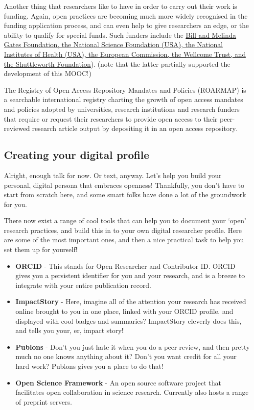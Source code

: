 \documentclass[]{book}
\begin{document}
Another thing that researchers like to have in order to carry out their work is funding. Again, open practices are becoming much more widely recognised in the funding application process, and can even help to give researchers an edge, or the ability to qualify for special funds. Such funders include the \href{http://whyopenresearch.org/funding}{Bill and Melinda Gates Foundation, the National Science Foundation (USA), the National Institutes of Health (USA), the European Commission, the Wellcome Trust, and the Shuttleworth Foundation}). (note that the latter partially supported the development of this MOOC!)

The Registry of Open Access Repository Mandates and Policies (ROARMAP) is a searchable international registry charting the growth of open access mandates and policies adopted by universities, research institutions and research funders that require or request their researchers to provide open access to their peer-reviewed research article output by depositing it in an open access repository.

\hypertarget{creating-your-digital-profile}{%
\subsection{Creating your digital profile }\label{creating-your-digital-profile}}

Alright, enough talk for now. Or text, anyway. Let's help you build your personal, digital persona that embraces openness! Thankfully, you don't have to start from scratch here, and some smart folks have done a lot of the groundwork for you.

There now exist a range of cool tools that can help you to document your `open' research practices, and build this in to your own digital researcher profile. Here are some of the most important ones, and then a nice practical task to help you set them up for yourself!

\begin{itemize}
\item
  \textbf{ORCID} - This stands for Open Researcher and Contributor ID. ORCID gives you a persistent identifier for you and your research, and is a breeze to integrate with your entire publication record.
\item
  \textbf{ImpactStory} - Here, imagine all of the attention your research has received online brought to you in one place, linked with your ORCID profile, and displayed with cool badges and summaries? ImpactStory cleverly does this, and tells you your, er, impact story!
\item
  \textbf{Publons} - Don't you just hate it when you do a peer review, and then pretty much no one knows anything about it? Don't you want credit for all your hard work? Publons gives you a place to do that!
\item
  \textbf{Open Science Framework} - An open source software project that facilitates open collaboration in science research. Currently also hosts a range of preprint servers.
\end{itemize}
\end{document}
